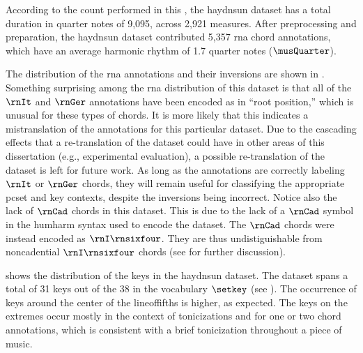 
According to the count performed in this \thesisdiss{}, the
\gls{haydnsun} dataset has a total duration in quarter notes
of 9,095, across 2,921 measures. After preprocessing and
preparation, the \gls{haydnsun} dataset contributed 5,357
\gls{rna} chord annotations, which have an average harmonic
rhythm of 1.7 quarter notes ($\musQuarter$).

The distribution of the \gls{rna} annotations and their
inversions are shown in .
Something surprising among the \gls{rna} distribution of
this dataset is that all of the $\rnIt$ and $\rnGer$
annotations have been encoded as in ``root position,'' which
is unusual for these types of chords. It is more likely that
this indicates a mistranslation of the annotations for this
particular dataset. Due to the cascading effects that a
re-translation of the dataset could have in other areas of
this dissertation (e.g., experimental evaluation), a
possible re-translation of the dataset is left for future
work. As long as the annotations are correctly labeling
$\rnIt$ or $\rnGer$ chords, they will remain useful for
classifying the appropriate \gls{pcset} and key contexts,
despite the inversions being incorrect. Notice also the lack
of $\rnCad$ chords in this dataset. This is due to the lack
of a $\rnCad$ symbol in the \gls{humharm} syntax used to
encode the dataset. The $\rnCad$ chords were instead encoded
as $\rnI\rnsixfour$. They are thus undistiguishable from
noncadential $\rnI\rnsixfour$ chords (see
 for
further discussion). 



 shows the distribution of the
keys in the \gls{haydnsun} dataset. The dataset spans a
total of 31 keys out of the 38 in the vocabulary $\setkey$
(see ). The occurrence of
keys around the center of the \gls{lineoffifths} is higher,
as expected. The keys on the extremes occur mostly in the
context of tonicizations and for one or two chord
annotations, which is consistent with a brief tonicization
throughout a piece of music.
